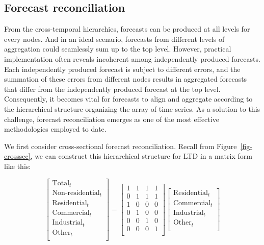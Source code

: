 \documentclass[
  11pt,
  a4paper,
]{article}
\begin{document}
\subsection{Forecast reconciliation}\label{forecast-reconciliation}

From the cross-temporal hierarchies, forecasts can be produced at all
levels for every nodes. And in an ideal scenario, forecasts from
different levels of aggregation could seamlessly sum up to the top
level. However, practical implementation often reveals incoherent among
independently produced forecasts. Each independently produced forecast
is subject to different errors, and the summation of these errors from
different nodes results in aggregated forecasts that differ from the
independently produced forecast at the top level. Consequently, it
becomes vital for forecasts to align and aggregate according to the
hierarchical structure organizing the array of time series. As a
solution to this challenge, forecast reconciliation emerges as one of
the most effective methodologies employed to date.

We first consider cross-sectional forecast reconciliation. Recall from
Figure~\ref{fig-crosssec}, we can construct this hierarchical structure
for LTD in a matrix form like this:

\[
\begin{bmatrix}
  \text{Total}_{t} \\
  \text{Non-residential}_{t} \\
  \text{Residential}_{t} \\
  \text{Commercial}_{t} \\
  \text{Industrial}_{t} \\
  \text{Other}_{t} \\
  \end{bmatrix}
=
\begin{bmatrix}
  1 & 1 & 1 & 1 \\
  0 & 1 & 1 & 1 \\
  1 & 0 & 0 & 0 \\
  0 & 1 & 0 & 0 \\
  0 & 0 & 1 & 0 \\
  0 & 0 & 0 & 1 \\
\end{bmatrix}
\begin{bmatrix}
  \text{Residential}_{t} \\
  \text{Commercial}_{t} \\
  \text{Industrial}_{t} \\
  \text{Other}_{t} \\
\end{bmatrix}
\]
\end{document}
